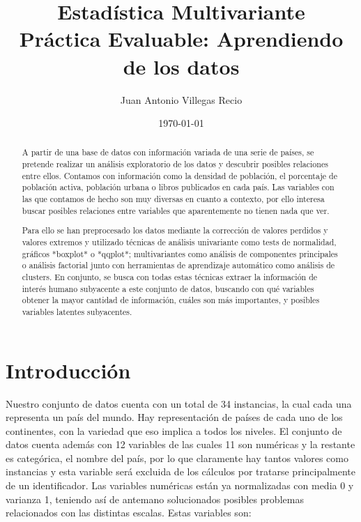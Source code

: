 \documentclass[letterpaper,11pt]{article}
\begin{document}
\title{Estadística Multivariante \\\textbf{Práctica Evaluable: Aprendiendo de los datos}}
\author{Juan Antonio Villegas Recio}
\date{\today}
\maketitle

\begin{abstract}

A partir de una base de datos con información variada de una serie de países, se pretende realizar un análisis exploratorio de los datos y descubrir posibles relaciones entre ellos. Contamos con información como la densidad de población, el porcentaje de población activa, población urbana o libros publicados en cada país. Las variables con las que contamos de hecho son muy diversas en cuanto a contexto, por ello interesa buscar posibles relaciones entre variables que aparentemente no tienen nada que ver. 

Para ello se han preprocesado los datos mediante la corrección de valores perdidos y valores extremos y utilizado técnicas de análisis univariante como tests de normalidad, gráficos *boxplot* o *qqplot*; multivariantes como análisis de componentes principales o análisis factorial junto con herramientas de aprendizaje automático como análisis de clusters. En conjunto, se busca con todas estas técnicas extraer la información de interés humano subyacente a este conjunto de datos, buscando con qué variables obtener la mayor cantidad de información, cuáles son más importantes, y posibles variables latentes subyacentes.
 
\end{abstract}

\section{Introducción}

Nuestro conjunto de datos cuenta con un total de 34 instancias, la cual cada una representa un país del mundo. Hay representación de países de cada uno de los continentes, con la variedad que eso implica a todos los niveles. El conjunto de datos cuenta además con 12 variables de las cuales 11 son numéricas y la restante es categórica, el nombre del país, por lo que claramente hay tantos valores como instancias y esta variable será excluida de los cálculos por tratarse principalmente de un identificador. Las variables numéricas están ya normalizadas con media 0 y varianza 1, teniendo así de antemano solucionados posibles problemas relacionados con las distintas escalas. Estas variables son:
\end{document}

